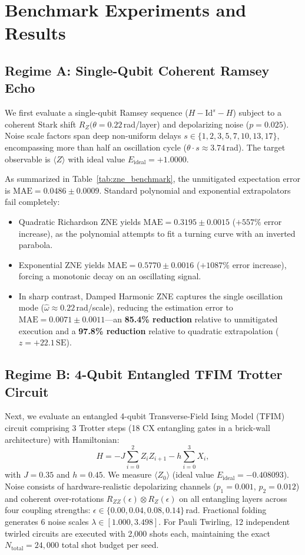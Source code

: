 \section{Benchmark Experiments and Results}

\subsection{Regime A: Single-Qubit Coherent Ramsey Echo}
We first evaluate a single-qubit Ramsey sequence ($H - \mathrm{Id}^s - H$) subject to a coherent Stark shift $R_Z(\theta = 0.22\,$rad/layer) and depolarizing noise ($p = 0.025$). Noise scale factors span deep non-uniform delays $s \in \{1, 2, 3, 5, 7, 10, 13, 17\}$, encompassing more than half an oscillation cycle ($\theta \cdot s \approx 3.74\,$rad). The target observable is $\langle Z \rangle$ with ideal value $E_{\mathrm{ideal}} = +1.0000$.

As summarized in Table~\ref{tab:zne_benchmark}, the unmitigated expectation error is $\mathrm{MAE} = 0.0486 \pm 0.0009$. Standard polynomial and exponential extrapolators fail completely:
\begin{itemize}
    \item Quadratic Richardson ZNE yields $\mathrm{MAE} = 0.3195 \pm 0.0015$ ($+557\%$ error increase), as the polynomial attempts to fit a turning curve with an inverted parabola.
    \item Exponential ZNE yields $\mathrm{MAE} = 0.5770 \pm 0.0016$ ($+1087\%$ error increase), forcing a monotonic decay on an oscillating signal.
    \item In sharp contrast, Damped Harmonic ZNE captures the single oscillation mode ($\hat{\omega} \approx 0.22\,$rad/scale), reducing the estimation error to $\mathrm{MAE} = 0.0071 \pm 0.0011$---an \textbf{85.4\% reduction} relative to unmitigated execution and a \textbf{97.8\% reduction} relative to quadratic extrapolation ($z = +22.1\,\mathrm{SE}$).
\end{itemize}

\subsection{Regime B: 4-Qubit Entangled TFIM Trotter Circuit}
Next, we evaluate an entangled 4-qubit Transverse-Field Ising Model (TFIM) circuit comprising 3 Trotter steps (18 $\mathrm{CX}$ entangling gates in a brick-wall architecture) with Hamiltonian:
\begin{equation}
H = -J \sum_{i=0}^2 Z_i Z_{i+1} - h \sum_{i=0}^3 X_i,
\end{equation}
with $J = 0.35$ and $h = 0.45$. We measure $\langle Z_0 \rangle$ (ideal value $E_{\mathrm{ideal}} = -0.408093$). Noise consists of hardware-realistic depolarizing channels ($p_1 = 0.001$, $p_2 = 0.012$) and coherent over-rotations $R_{ZZ}(\epsilon) \otimes R_Z(\epsilon)$ on all entangling layers across four coupling strengths: $\epsilon \in \{0.00, 0.04, 0.08, 0.14\}\,$rad. Fractional folding generates 6 noise scales $\lambda \in [1.000, 3.498]$. For Pauli Twirling, 12 independent twirled circuits are executed with 2,000 shots each, maintaining the exact $N_{\mathrm{total}} = 24{,}000$ total shot budget per seed.


